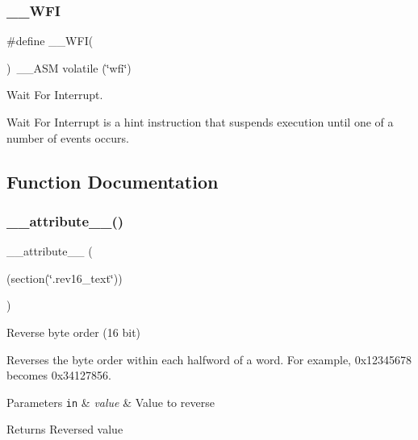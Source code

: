 \subsubsection{\texorpdfstring{\+\_\+\+\_\+\+W\+FI}{\_\_WFI}\hspace{0.1cm}{\footnotesize\ttfamily [3/3]}}
{\footnotesize\ttfamily \#define \+\_\+\+\_\+\+W\+FI(\begin{DoxyParamCaption}{ }\end{DoxyParamCaption})~\+\_\+\+\_\+\+A\+SM volatile (\char`\"{}wfi\char`\"{})}



Wait For Interrupt. 

Wait For Interrupt is a hint instruction that suspends execution until one of a number of events occurs. 

\subsection{Function Documentation}
\mbox{\label{group___c_m_s_i_s___core___instruction_interface_gae84a2733711339c5eefeb0d899506b96}} 
\subsubsection{\texorpdfstring{\+\_\+\+\_\+attribute\+\_\+\+\_\+()}{\_\_attribute\_\_()}\hspace{0.1cm}{\footnotesize\ttfamily [1/3]}}
{\footnotesize\ttfamily \+\_\+\+\_\+attribute\+\_\+\+\_\+ (\begin{DoxyParamCaption}\item[{(section(\char`\"{}.rev16\+\_\+text\char`\"{}))}]{ }\end{DoxyParamCaption})}



Reverse byte order (16 bit) 

Reverses the byte order within each halfword of a word. For example, 0x12345678 becomes 0x34127856. 
\begin{DoxyParams}[1]{Parameters}
\mbox{\tt in}  & {\em value} & Value to reverse \\
\hline
\end{DoxyParams}
\begin{DoxyReturn}{Returns}
Reversed value 
\end{DoxyReturn}
\mbox{\label{group___c_m_s_i_s___core___instruction_interface_gabe2b619a40cc0a7ffa8f765249ccf682}} 
